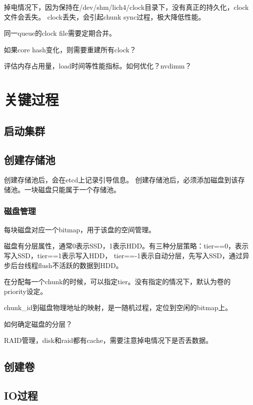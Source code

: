 掉电情况下，因为保持在/dev/shm/lich4/clock目录下，没有真正的持久化，clock文件会丢失。
clock丢失，会引起chunk sync过程，极大降低性能。

同一queue的clock file需要定期合并。

如果core hash变化，则需要重建所有clock？

评估内存占用量，load时间等性能指标。如何优化？nvdimm？

\section{关键过程}

\subsection{启动集群}

\subsection{创建存储池}

创建存储池后，会在etcd上记录引导信息。
创建存储池后，必须添加磁盘到该存储池。一块磁盘只能属于一个存储池。

\subsubsection{磁盘管理}

每块磁盘对应一个bitmap，用于该盘的空间管理。

磁盘有分层属性，通常0表示SSD，1表示HDD。有三种分层策略：tier==0，表示写入SSD，tier==1表示写入HDD，
tier==-1表示自动分层，先写入SSD，通过异步后台线程flush不活跃的数据到HDD。

在分配每一个chunk的时候，可以指定tier。没有指定的情况下，默认为卷的priority设定。

chunk\_id到磁盘物理地址的映射，是一随机过程，定位到空闲的bitmap上。

如何确定磁盘的分层？

RAID管理，disk和raid都有cache，需要注意掉电情况下是否丢数据。

\subsection{创建卷}

\subsection{IO过程}


